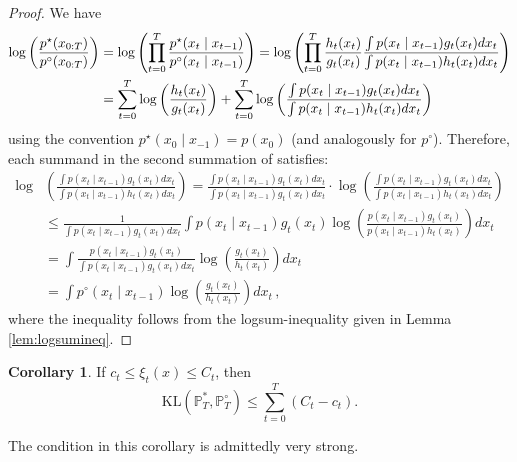 \documentclass[11pt,reqno]{amsart}
\theoremstyle{definition}
\newtheorem{cor}[thm]{Corollary}
\def \pcirc {p^\circ}
\def \pstar {p^\star}
\begin{document}
\begin{proof}
We have 
\begin{align}\label{logratiosums}
\log \left(\frac{\pstar(x_{0:T})}{\pcirc(x_{0:T})}\right) &= \log \left(\prod_{t = 0}^T \frac{\pstar(x_t \mid x_{t-1})}{\pcirc(x_t \mid x_{t-1})}\right) = \log \left(\prod_{t = 0}^T \frac{h_t(x_t)}{g_t(x_t)} \frac{\int p(x_t \mid x_{t - 1}) g_t(x_t) dx_t}{\int p(x_t \mid x_{t - 1}) h_t(x_t) dx_t}\right) \notag\\
&= \sum_{t = 0}^T \log\left(\frac{h_t(x_t)}{g_t(x_t)} \right) + \sum_{t = 0}^T \log\left( \frac{\int p(x_t \mid x_{t - 1}) g_t(x_t) dx_t}{\int p(x_t \mid x_{t - 1}) h_t(x_t) dx_t}\right) \, \notag
\end{align}
using the convention $\pstar(x_0 \mid x_{-1}) = p(x_0)$ (and analogously for $\pcirc$).
Therefore, each  summand in the second summation of satisfies:
\begin{align*}
\log & \left(\frac{\int p(x_t \mid x_{t - 1}) g_t(x_t) dx_t}{\int p(x_t \mid x_{t - 1}) h_t(x_t) dx_t}\right) = \frac{\int p(x_t \mid x_{t - 1}) g_t(x_t) dx_t}{\int p(x_t \mid x_{t - 1}) g_t(x_t) dx_t} \cdot \log\left( \frac{\int p(x_t \mid x_{t - 1}) g_t(x_t) dx_t}{\int p(x_t \mid x_{t - 1}) h_t(x_t) dx_t}\right) \\ &\leq \frac{1}{\int p(x_t \mid x_{t - 1}) g_t(x_t) dx_t} 
\int p(x_t \mid x_{t - 1}) g_t(x_t) \log\left( \frac{p(x_t \mid x_{t - 1}) g_t(x_t)}{p(x_t \mid x_{t - 1}) h_t(x_t)}\right) dx_t \\
&=  
\int \frac{p(x_t \mid x_{t - 1}) g_t(x_t)}{\int p(x_t \mid x_{t - 1}) g_t(x_t) dx_t} \log\left( \frac{g_t(x_t)}{ h_t(x_t)}\right) dx_t \\&= \int \pcirc(x_t \mid x_{t - 1}) \log\left( \frac{g_t(x_t)}{ h_t(x_t)}\right) dx_t \, ,
\end{align*}
where the inequality follows from the logsum-inequality given in Lemma \ref{lem:logsumineq}. 
\end{proof}





\begin{cor}
	If $c_t \le \xi_t(x) \le C_t$, then 
	\[ \text{KL}(\mathbb{P}_T^*, \mathbb{P}_T^\circ) \le \sum_{t=0}^T (C_t-c_t). \]
\end{cor}
The condition in this corollary is admittedly very strong. 
\end{document}
